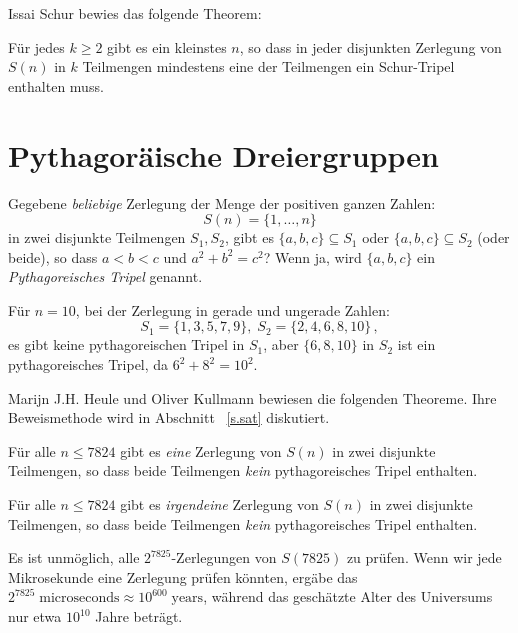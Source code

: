 Issai Schur bewies das folgende Theorem:
\begin{theorem}[Schur]
Für jedes $k\geq 2$ gibt es ein kleinstes $n$, so dass in jeder disjunkten Zerlegung von $S(n)$ in $k$ Teilmengen mindestens eine der Teilmengen ein Schur-Tripel enthalten muss.
\end{theorem}


\section{Pythagoräische Dreiergruppen}\label{s.pyth}

\begin{definition}
Gegebene \emph{beliebige} Zerlegung der Menge der positiven ganzen Zahlen:
\[
S(n)=\{1,\ldots,n\}
\]
in zwei disjunkte Teilmengen $S_1,S_2$, gibt es $\{a,b,c\}\subseteq S_1$ oder $\{a,b,c\}\subseteq S_2$ (oder beide), so dass $a\!<\!b\!<\!c$ und $a^2+b^2=c^2$? Wenn ja, wird $\{a,b,c\}$ ein \emph{Pythagoreisches Tripel} genannt.
\end{definition}

\begin{example}
Für $n=10$, bei der Zerlegung in gerade und ungerade Zahlen:
\[
S_1 = \{1,3,5,7,9\},\; S_2=\{2,4,6,8,10\}\,,
\]
es gibt keine pythagoreischen Tripel in $S_1$, aber $\{6,8,10\}$ in $S_2$ ist ein pythagoreisches Tripel, da $6^2+8^2=10^2$.
\end{example}

Marijn J.H. Heule und Oliver Kullmann bewiesen die folgenden Theoreme. Ihre Beweismethode wird in Abschnitt ~\ref{s.sat} diskutiert.

\begin{theorem}
Für alle $n\leq 7824$ gibt es \emph{eine} Zerlegung von $S(n)$ in zwei disjunkte Teilmengen, so dass beide Teilmengen \emph{kein} pythagoreisches Tripel enthalten.
\end{theorem}

\begin{theorem}
Für alle $n\leq 7824$ gibt es \emph{irgendeine} Zerlegung von $S(n)$ in zwei disjunkte Teilmengen, so dass beide Teilmengen \emph{kein} pythagoreisches Tripel enthalten.
\end{theorem}
Es ist unmöglich, alle $2^{7825}$-Zerlegungen von $S(7825)$ zu prüfen. Wenn wir jede Mikrosekunde eine Zerlegung prüfen könnten, ergäbe das $2^{7825}\; \textrm{microseconds}\approx 10^{600}\; \textrm{years}$, während das geschätzte Alter des Universums nur etwa $10^{10}$ Jahre beträgt.

